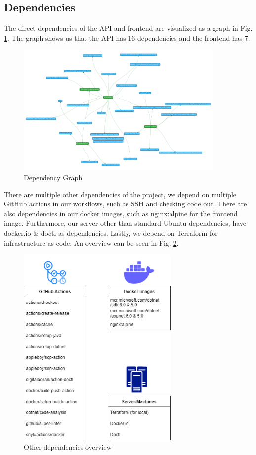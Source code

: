 \documentclass[10pt]{article}
\begin{document}
\subsection{Dependencies}
The direct dependencies of the API and frontend are visualized as a graph in Fig. \ref{fig:depgrapg}. The graph shows us that the API has 16 dependencies and the frontend has 7.
\begin{figure} [H]
  \centering
  \includegraphics[width=0.9\textwidth]{images/dependencygraph.png}
  \caption{Dependency Graph}
  \label{fig:depgrapg}
\end{figure}

There are multiple other dependencies of the project, we depend on multiple GitHub actions in our workflows, such as SSH and checking code out. There are also dependencies in our docker images, such as nginx:alpine for the frontend image. Furthermore, our server other than standard Ubuntu dependencies, have docker.io \& doctl as dependencies. Lastly, we depend on Terraform for infrastructure as code. An overview can be seen in Fig. \ref{fig:otherdep}.

\begin{figure} [H]
  \centering
  \includegraphics[width=0.7\textwidth]{images/devops-otherdependencies.png}
  \caption{Other dependencies overview}
  \label{fig:otherdep}
\end{figure}
\end{document}
